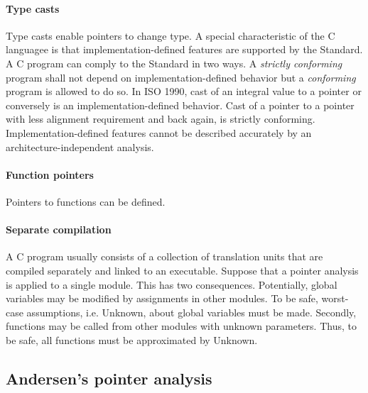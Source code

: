\paragraph{Type casts}
Type casts enable pointers to change type. A special characteristic of the C
languagee is that implementation-defined features are supported by the Standard.
A C program can comply to the Standard in two ways. A
\textit{strictly conforming} program shall not depend on implementation-defined
behavior but a \textit{conforming} program is allowed to do so. In ISO 1990,
cast of an integral value to a pointer or conversely is an
implementation-defined behavior. Cast of a pointer to a pointer with less
alignment requirement and back again, is strictly conforming.
Implementation-defined features cannot be described accurately by an
architecture-independent analysis.

\paragraph{Function pointers}
Pointers to functions can be defined.

\paragraph{Separate compilation}
A C program usually consists of a collection of translation units that are
compiled separately and linked to an executable. Suppose that a pointer analysis
is applied to a single module. This has two consequences. Potentially, global
variables may be modified by assignments in other modules. To be safe,
worst-case assumptions, i.e. Unknown, about global variables must be made.
Secondly, functions may be called from other modules with unknown parameters.
Thus, to be safe, all functions must be approximated by Unknown.

\subsection{Andersen's pointer analysis}



